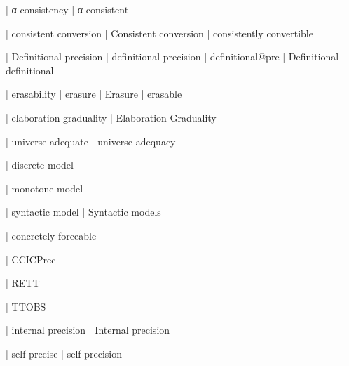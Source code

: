   | α-consistency
  | α-consistent

  | consistent conversion
  | Consistent conversion
  | consistently convertible

  | Definitional precision
  | definitional precision
  | definitional@pre
  | Definitional
  | definitional

  | erasability
  | erasure
  | Erasure
  | erasable

  | elaboration graduality
  | Elaboration Graduality

  | universe adequate
  | universe adequacy


  | discrete model

  | monotone model

  | syntactic model
  | Syntactic models

  | concretely forceable

  | CCICPrec

  | RETT

  | TTOBS

  | internal precision
  | Internal precision

  | self-precise
  | self-precision